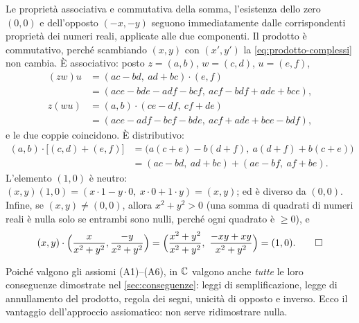 \begin{dimostrazione}
Le proprietà associativa e commutativa della somma, l'esistenza dello zero $(0,0)$ e
dell'opposto $(-x,-y)$ seguono immediatamente dalle corrispondenti proprietà dei numeri
reali, applicate alle due componenti. Il prodotto è commutativo, perché scambiando
$(x,y)$ con $(x',y')$ la \eqref{eq:prodotto-complessi} non cambia. È associativo: posto
$z=(a,b)$, $w=(c,d)$, $u=(e,f)$,
\begin{align*}
  (zw)u&=(ac-bd,\ ad+bc)\cdot(e,f)\\
       &=(ace-bde-adf-bcf,\ acf-bdf+ade+bce),\\
  z(wu)&=(a,b)\cdot(ce-df,\ cf+de)\\
       &=(ace-adf-bcf-bde,\ acf+ade+bce-bdf),
\end{align*}
e le due coppie coincidono. È distributivo:
\begin{align*}
  (a,b)\cdot\bigl[(c,d)+(e,f)\bigr]&=\bigl(a(c+e)-b(d+f),\ a(d+f)+b(c+e)\bigr)\\
  &=(ac-bd,\ ad+bc)+(ae-bf,\ af+be).
\end{align*}
L'elemento $(1,0)$ è neutro: $(x,y)(1,0)=(x\cdot1-y\cdot0,\ x\cdot0+1\cdot y)=(x,y)$; ed
è diverso da $(0,0)$. Infine, se $(x,y)\neq(0,0)$, allora $x^{2}+y^{2}>0$ (una somma di
quadrati di numeri reali è nulla solo se entrambi sono nulli, perché ogni quadrato è
$\ge0$), e
\[
  (x,y)\cdot\Bigl(\frac{x}{x^{2}+y^{2}},\frac{-y}{x^{2}+y^{2}}\Bigr)
  =\Bigl(\frac{x^{2}+y^{2}}{x^{2}+y^{2}},\ \frac{-xy+xy}{x^{2}+y^{2}}\Bigr)=(1,0). \qedhere
\]
\end{dimostrazione}

Poiché valgono gli assiomi (A1)--(A6), in $\mathbb{C}$ valgono anche \emph{tutte} le loro
conseguenze dimostrate nel \cref{sec:conseguenze}: leggi di semplificazione, legge di
annullamento del prodotto, regola dei segni, unicità di opposto e inverso. Ecco il
vantaggio dell'approccio assiomatico: non serve ridimostrare nulla.

